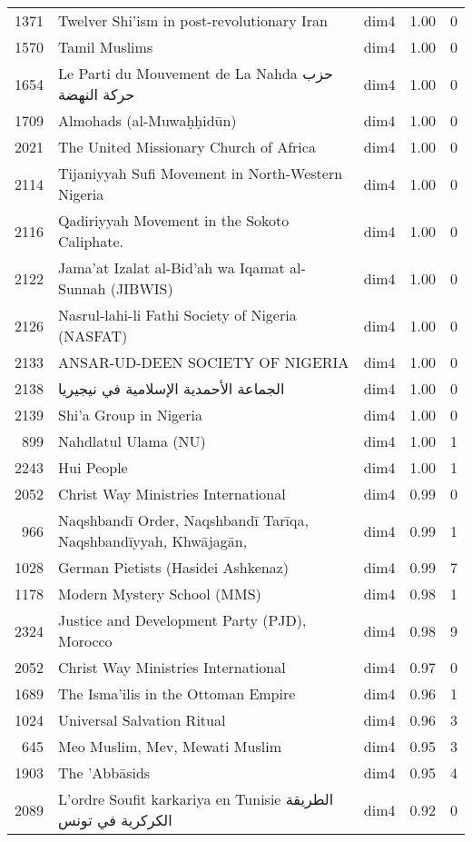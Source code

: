 \begin{tabular}{rllrr}
1371 & Twelver Shi'ism in post-revolutionary Iran & dim4 & 1.00 & 0 \\
1570 & Tamil Muslims & dim4 & 1.00 & 0 \\
1654 & Le Parti du Mouvement de La Nahda حزب حركة النهضة & dim4 & 1.00 & 0 \\
1709 & Almohads (al-Muwaḥḥidūn) & dim4 & 1.00 & 0 \\
2021 & The United Missionary Church of Africa & dim4 & 1.00 & 0 \\
2114 & Tijaniyyah Sufi Movement in North-Western Nigeria & dim4 & 1.00 & 0 \\
2116 & Qadiriyyah Movement in the Sokoto Caliphate. & dim4 & 1.00 & 0 \\
2122 & Jama'at Izalat al-Bid'ah wa Iqamat al-Sunnah (JIBWIS) & dim4 & 1.00 & 0 \\
2126 & Nasrul-lahi-li Fathi Society of Nigeria (NASFAT) & dim4 & 1.00 & 0 \\
2133 & ANSAR-UD-DEEN SOCIETY OF NIGERIA & dim4 & 1.00 & 0 \\
2138 & الجماعة الأحمدية الإسلامية في نيجيريا & dim4 & 1.00 & 0 \\
2139 & Shi'a Group in Nigeria & dim4 & 1.00 & 0 \\
899 & Nahdlatul Ulama (NU) & dim4 & 1.00 & 1 \\
2243 & Hui People & dim4 & 1.00 & 1 \\
2052 & Christ Way Ministries International & dim4 & 0.99 & 0 \\
966 & Naqshbandī Order, Naqshbandī Tarīqa, Naqshbandīyyah, Khwājagān, & dim4 & 0.99 & 1 \\
1028 & German Pietists (Hasidei Ashkenaz) & dim4 & 0.99 & 7 \\
1178 & Modern Mystery School (MMS) & dim4 & 0.98 & 1 \\
2324 & Justice and Development Party (PJD), Morocco & dim4 & 0.98 & 9 \\
2052 & Christ Way Ministries International & dim4 & 0.97 & 0 \\
1689 & The Isma'ilis in the Ottoman Empire & dim4 & 0.96 & 1 \\
1024 & Universal Salvation Ritual & dim4 & 0.96 & 3 \\
645 & Meo Muslim, Mev, Mewati Muslim & dim4 & 0.95 & 3 \\
1903 & The 'Abbāsids & dim4 & 0.95 & 4 \\
2089 & L'ordre Soufit karkariya en Tunisie الطريقة الكركرية في تونس & dim4 & 0.92 & 0 \\

\end{tabular}
